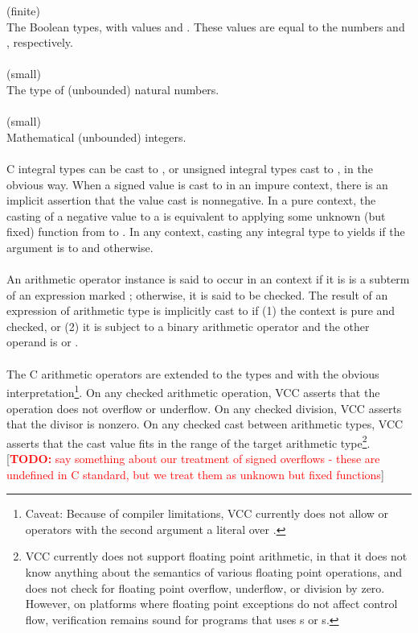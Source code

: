 \documentclass[preprint,nocopyrightspace]{sigplanconf}
\newcommand{\todo}[1]{[\textcolor{red}{\textbf{TODO:} {#1}}]}
\begin{document}
{{\vcc{\bool} (finite)\\
The Boolean types, with values \vcc{\true} and \vcc{\false}. These
values are equal to the \vcc{\natural} numbers  and , respectively.
\\\\
\vcc{\natural} (small)\\
The type of (unbounded) natural numbers. 
\\\\
\vcc{\integer} (small)\\
Mathematical (unbounded) integers. 
\\\\
C integral types can be cast to \vcc{\integer},
or unsigned integral types cast to \vcc{\natural}, in the obvious
way. When a signed value is cast to \vcc{\natural} in an impure
context, there is an implicit assertion that the value cast is
nonnegative. In a pure context, the casting of a negative value to 
a \vcc{\natural} is equivalent to applying some unknown (but fixed)
function from  to . In any context, casting
any integral type to \vcc{\bool} yields \vcc{\true} if the argument
is \vcc{==} to  and \vcc{\false} otherwise.
\\\\
An arithmetic operator instance is said to occur in
an \vcc{\unchecked} context if it is is a subterm of an expression
marked ; otherwise, it is said to be checked. The
result of an expression of arithmetic type is implicitly cast
to \vcc{\integer} if (1) the context is pure and checked, or (2) it is
subject to a binary arithmetic operator and the other operand
is \vcc{\natural} or \vcc{\integer}.
\\\\
The C arithmetic operators are extended to the types \vcc{\natural}
and \vcc{\integer} with the obvious interpretation\footnote{
Caveat: Because of compiler limitations, VCC currently does not allow
\vcc{<<} or \vcc{>>} operators with the second argument a literal over .
}. 
On any checked arithmetic operation, VCC asserts that the operation
does not overflow or underflow. On any checked division, VCC asserts
that the divisor is nonzero. On any checked cast between arithmetic
types, VCC asserts that the cast value fits in the range of the target
arithmetic type\footnote{
VCC currently does not support floating point arithmetic, in that it
does not know anything about the semantics of various floating point
operations, and does not check for floating point overflow, underflow,
or division by zero. However, on platforms where floating point
exceptions do not affect control flow, verification remains sound for
programs that uses s or s.
}.
\todo{say something about our treatment of signed overflows - these 
are undefined in C standard, but we treat them as unknown but fixed functions}

}}
\end{document}
